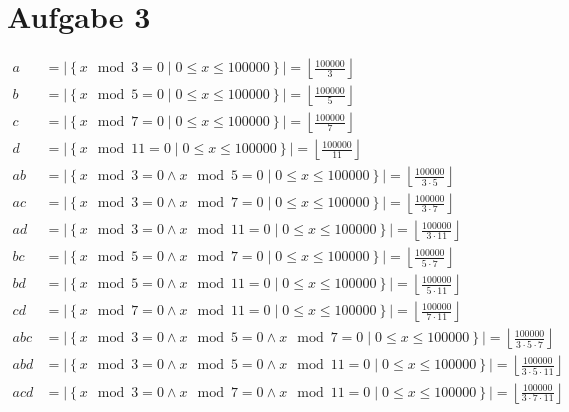 \documentclass[a4paper]{scrartcl}
\begin{document}
\section*{Aufgabe 3}
\begin{align*}
    a &= \left|\left\{ x \mod 3 = 0 \mid 0 \leq x \leq 100000 \right\}\right| = \left\lfloor\frac{100000}{3}\right\rfloor \\
    b &= \left|\left\{ x \mod 5 = 0 \mid 0 \leq x \leq 100000 \right\}\right| = \left\lfloor\frac{100000}{5}\right\rfloor \\
    c &= \left|\left\{ x \mod 7 = 0 \mid 0 \leq x \leq 100000 \right\}\right| = \left\lfloor\frac{100000}{7}\right\rfloor \\
    d &= \left|\left\{ x \mod 11 = 0 \mid 0 \leq x \leq 100000 \right\}\right| = \left\lfloor\frac{100000}{11}\right\rfloor \\
    ab &= \left|\left\{ x \mod 3 = 0 \land x \mod 5 = 0 \mid 0 \leq x \leq 100000 \right\}\right| = \left\lfloor\frac{100000}{3 \cdot 5}\right\rfloor \\
    ac &= \left|\left\{ x \mod 3 = 0 \land x \mod 7 = 0 \mid 0 \leq x \leq 100000 \right\}\right| = \left\lfloor\frac{100000}{3 \cdot 7}\right\rfloor \\
    ad &= \left|\left\{ x \mod 3 = 0 \land x \mod 11 = 0 \mid 0 \leq x \leq 100000 \right\}\right| = \left\lfloor\frac{100000}{3 \cdot 11}\right\rfloor \\
    bc &= \left|\left\{ x \mod 5 = 0 \land x \mod 7 = 0 \mid 0 \leq x \leq 100000 \right\}\right| = \left\lfloor\frac{100000}{5 \cdot 7}\right\rfloor \\
    bd &= \left|\left\{ x \mod 5 = 0 \land x \mod 11 = 0 \mid 0 \leq x \leq 100000 \right\}\right| = \left\lfloor\frac{100000}{5 \cdot 11}\right\rfloor \\
    cd &= \left|\left\{ x \mod 7 = 0 \land x \mod 11 = 0 \mid 0 \leq x \leq 100000 \right\}\right| = \left\lfloor\frac{100000}{7 \cdot 11}\right\rfloor \\
    abc &= \left|\left\{ x \mod 3 = 0 \land x \mod 5 = 0 \land x \mod 7 = 0 \mid 0 \leq x \leq 100000 \right\}\right| = \left\lfloor\frac{100000}{3 \cdot 5 \cdot 7}\right\rfloor \\
    abd &= \left|\left\{ x \mod 3 = 0 \land x \mod 5 = 0 \land x \mod 11 = 0 \mid 0 \leq x \leq 100000 \right\}\right| = \left\lfloor\frac{100000}{3 \cdot 5 \cdot 11}\right\rfloor \\
    acd &= \left|\left\{ x \mod 3 = 0 \land x \mod 7 = 0 \land x \mod 11 = 0 \mid 0 \leq x \leq 100000 \right\}\right| = \left\lfloor\frac{100000}{3 \cdot 7 \cdot 11}\right\rfloor \\

\end{align*}
\end{document}
